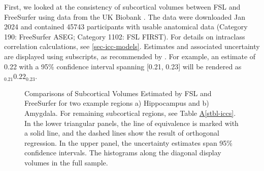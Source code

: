 \documentclass[
  authoryear,
  preprint,
  1p]{elsarticle}
\newcommand*\quartostblref[1]{Table \hyperref[#1]{A\ref{#1}}}
\begin{document}
First, we looked at the consistency of subcortical volumes between FSL
and FreeSurfer using data from the UK Biobank
\citep{alfaro-almagro_image_2018}. The data were downloaded Jan 2024 and
contained 45743 participants with usable anatomical data (Category 190:
FreeSurfer ASEG; Category 1102: FSL FIRST). For details on intraclass
correlation calculations, see \ref{sec-icc-models}. Estimates and
associated uncertainty are displayed using subscripts, as recommended by
\citet{louis_effective_2008}. For example, an estimate of 0.22 with a
95\% confidence interval spanning {[}0.21, 0.23{]} will be rendered as
\(_{0.21}0.22_{0.23}\).

\begin{figure}


\caption{\label{fig-vol-comparison}Comparisons of Subcortical Volumes
Estimated by FSL and FreeSurfer for two example regions a) Hippocampus
and b) Amygdala. For remaining subcortical regions, see
\quartostblref{stbl-iccs}. In the lower triangular panels, the line of
equivalence is marked with a solid line, and the dashed lines show the
result of orthogonal regression. In the upper panel, the uncertainty
estimates span 95\% confidence intervals. The histograms along the
diagonal display volumes in the full sample.}

\end{figure}%
\end{document}
